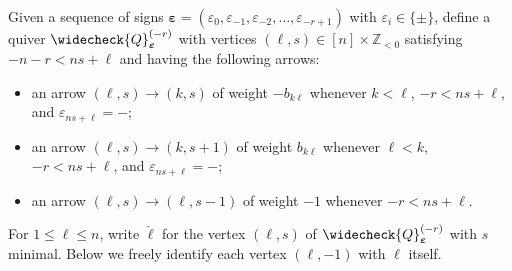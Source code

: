 \documentclass{amsart}
\numberwithin{theorem}{section}
\newcommand{\ZZ}{\mathbb{Z}}
\newcommand{\beps}{{\boldsymbol{\varepsilon}}}
\begin{document}
  Given a sequence of signs $\beps=(\varepsilon_0,\varepsilon_{-1},\varepsilon_{-2},\ldots,\varepsilon_{-r+1})$ with $\varepsilon_i\in\{\pm\}$, define a quiver $\widecheck{Q}^{(-r)}_\beps$ with vertices $(\ell,s)\in [n]\times\ZZ_{<0}$ satisfying $-n-r<ns+\ell$ and having the following arrows:
  \begin{itemize}
    \item an arrow $(\ell,s)\to (k,s)$ of weight $-b_{k\ell}$ whenever $k<\ell$, $-r<ns+\ell$, and $\varepsilon_{ns+\ell}=-$;
    \item an arrow $(\ell,s)\to (k,s+1)$ of weight $b_{k\ell}$ whenever $\ell<k$, $-r<ns+\ell$, and $\varepsilon_{ns+\ell}=-$;
    \item an arrow $(\ell,s)\to (\ell,s-1)$ of weight $-1$ whenever $-r<ns+\ell$.
  \end{itemize}
  For $1\le\ell\le n$, write $\check{\ell}$ for the vertex $(\ell,s)$ of $\widecheck{Q}^{(-r)}_\beps$ with $s$ minimal.
  Below we freely identify each vertex $(\ell,-1)$ with $\ell$ itself.
\end{document}
